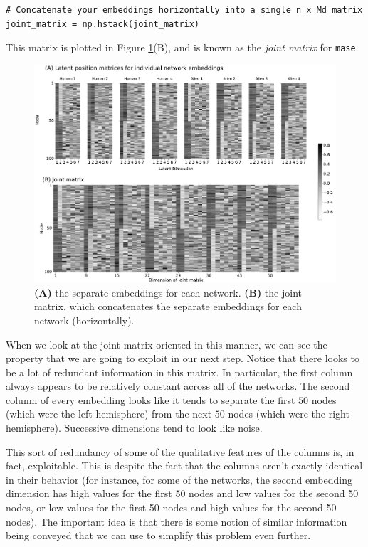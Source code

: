 \begin{lstlisting}[style=python]
# Concatenate your embeddings horizontally into a single n x Md matrix
joint_matrix = np.hstack(joint_matrix)
\end{lstlisting}

This matrix is plotted in Figure \ref{fig:ch6:multinet:mase:ase_joint}(B), and is known as the \textit{joint matrix} for \texttt{mase}.

\begin{figure}[h]
    \centering
    \includegraphics[width=\linewidth]{representations/ch6/Images/mase_embed_joint.png}
    \caption[\texttt{mase} joint matrix]{\textbf{(A)} the separate embeddings for each network. \textbf{(B)} the joint matrix, which concatenates the separate embeddings for each network (horizontally).}
    \label{fig:ch6:multinet:mase:ase_joint}
\end{figure}

When we look at the joint matrix oriented in this manner, we can see the property that we are going to exploit in our next step. Notice that there looks to be a lot of redundant information in this matrix. In particular, the first column always appears to be relatively constant across all of the networks. The second column of every embedding looks like it tends to separate the first $50$ nodes (which were the left hemisphere) from the next $50$ nodes (which were the right hemisphere). Successive dimensions tend to look like noise.

This sort of redundancy of some of the qualitative features of the columns is, in fact, exploitable. This is despite the fact that the columns aren't exactly identical in their behavior (for instance, for some of the networks, the second embedding dimension has high values for the first 50 nodes and low values for the second 50 nodes, or low values for the first 50 nodes and high values for the second 50 nodes). The important idea is that there is some notion of similar information being conveyed that we can use to simplify this problem even further.

